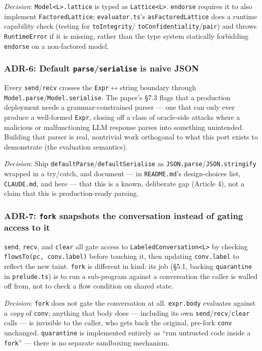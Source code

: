 \documentclass[11pt, a4paper]{article}
\begin{document}
\emph{Decision}: \texttt{Model<L>.lattice} is typed as \texttt{Lattice<L>}.
\texttt{endorse} requires it to also implement \texttt{FactoredLattice};
\texttt{evaluator.ts}'s \texttt{asFactoredLattice} does a runtime capability
check (testing for \texttt{toIntegrity}/
\texttt{toConfidentiality}/\texttt{pair}) and throws \texttt{RuntimeError} if
it is missing, rather than the type system statically forbidding
\texttt{endorse} on a non-factored model.


\subsubsection{ADR-6: Default \texttt{parse}/\texttt{serialise} is naive JSON}

Every \texttt{send}/\texttt{recv} crosses the
\texttt{Expr}$\leftrightarrow$string boundary through
\texttt{Model.parse}/\texttt{Model.serialise}. The paper's §7.3 flags that a
production deployment needs a grammar-constrained parser --- one that can only
ever produce a well-formed \texttt{Expr}, closing off a class of oracle-side
attacks where a malicious or malfunctioning LLM response parses into something
unintended.  Building that parser is real, nontrivial work orthogonal to what
this port exists to demonstrate (the evaluation semantics).

\emph{Decision}: Ship \texttt{defaultParse}/\texttt{defaultSerialise} as
\texttt{JSON.parse}/\texttt{JSON.stringify} wrapped in a try/catch, and
document --- in \texttt{README.md}'s design-choices list, \texttt{CLAUDE.md},
and here --- that this is a known, deliberate gap (Article 4), not a claim that
this is production-ready parsing.


\subsubsection{ADR-7: \texttt{fork} snapshots the conversation instead of
gating access to it}

\texttt{send}, \texttt{recv}, and \texttt{clear} all gate access to
\texttt{LabeledConversation<L>} by checking \texttt{flowsTo(pc, conv.label)}
before touching it, then updating \texttt{conv.label} to reflect the new taint.
\texttt{fork} is different in kind: its job (§5.1, backing \texttt{quarantine}
in \texttt{prelude.ts}) is to run a sub-program against a conversation the
caller is walled off from, not to check a flow condition on shared state.

\emph{Decision}: \texttt{fork} does not gate the conversation at all.
\texttt{expr.body} evaluates against a \emph{copy} of \texttt{conv}; anything
that body does --- including its own \texttt{send}/\texttt{recv}/\texttt{clear}
calls --- is invisible to the caller, who gets back the original, pre-fork
\texttt{conv} unchanged. \texttt{quarantine} is implemented entirely as ``run
untrusted code inside a \texttt{fork}'' --- there is no separate sandboxing
mechanism.
\end{document}
